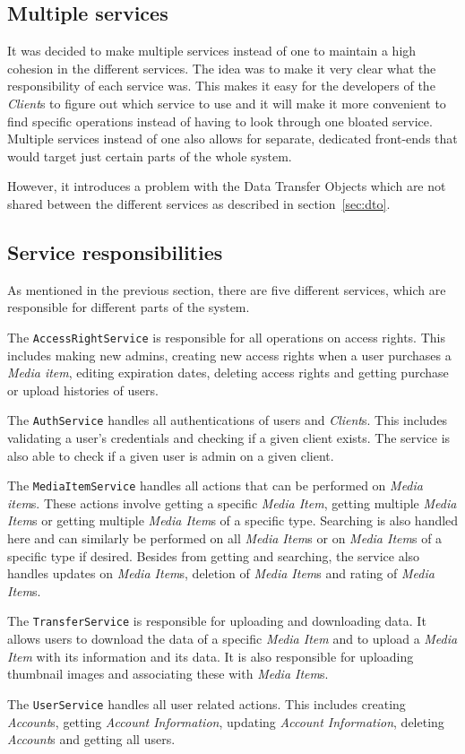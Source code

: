 \documentclass[../report.tex]{subfiles}
\begin{document}
\subsection{Multiple services}
It was decided to make multiple services instead of one to maintain a high cohesion in the different services.
The idea was to make it very clear what the responsibility of each service was. 
This makes it easy for the developers of the \textit{Client}s to figure out which service to use and it will make it more convenient to find specific operations instead of having to look through one bloated service.
Multiple services instead of one also allows for separate, dedicated front-ends that would target just certain parts of the whole system. 

However, it introduces a problem with the Data Transfer Objects which are not shared between the different services as described in section~\ref{sec:dto}.

\subsection{Service responsibilities}
As mentioned in the previous section, there are five different services, which are responsible for different parts of the system. 

The \texttt{AccessRightService} is responsible for all operations on access rights. This includes making new admins, creating new access rights when a user purchases a \textit{Media item}, editing expiration dates, deleting access rights and getting purchase or upload histories of users. 

The \texttt{AuthService} handles all authentications of users and \textit{Client}s.
This includes validating a user's credentials and checking if a given client exists.
The service is also able to check if a given user is admin on a given client.

The \texttt{MediaItemService} handles all actions that can be performed on \textit{Media item}s. These actions involve getting a specific \textit{Media Item}, getting multiple \textit{Media Item}s or getting multiple \textit{Media Item}s of a specific type. Searching is also handled here and can similarly be performed on all \textit{Media Item}s or on \textit{Media Item}s of a specific type if desired. Besides from getting and searching, the service also handles updates on \textit{Media Item}s, deletion of \textit{Media Item}s and rating of \textit{Media Item}s.

The \texttt{TransferService} is responsible for uploading and downloading data. It allows users to download the data of a specific \textit{Media Item} and to upload a \textit{Media Item} with its information and its data. It is also responsible for uploading thumbnail images and associating these with \textit{Media Item}s.

The \texttt{UserService} handles all user related actions. This includes creating \textit{Account}s, getting \textit{Account Information}, updating \textit{Account Information}, deleting \textit{Account}s and getting all users. 
\end{document}
